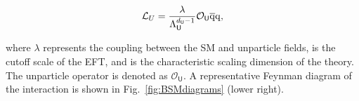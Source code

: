 \begin{equation*}
\mathcal{L}_{U}  = \frac{\lambda}{\Lambda_{\textsf{U}}^{d_{\textsf{U}}-1}} \mathcal{O}_{\textsf{U}} \overline{\mathrm{q}}\mathrm{q},
\end{equation*}

\noindent where $\lambda$ represents the coupling between the SM and unparticle fields, \LU is the cutoff scale of the EFT, and \dU is the characteristic scaling dimension of the theory.
The unparticle operator is denoted as $\mathcal{O}_{\textsf{U}}$.
A representative Feynman diagram of the interaction is shown in Fig.~\ref{fig:BSMdiagrams} (lower right).


